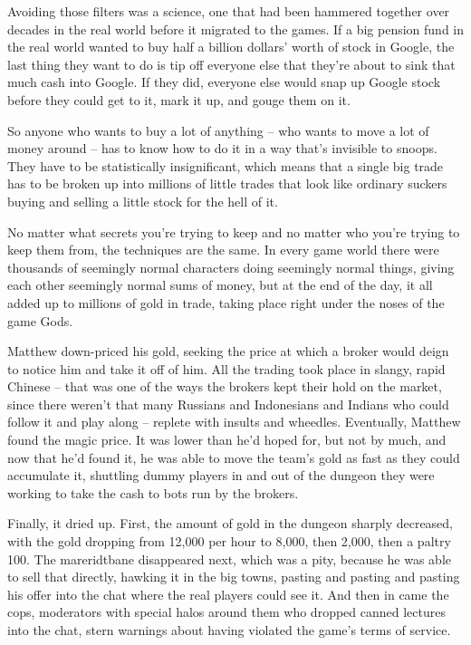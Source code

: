 Avoiding those filters was a science, one that had been hammered
together over decades in the real world before it migrated to the
games. If a big pension fund in the real world wanted to buy half a
billion dollars' worth of stock in Google, the last thing they want
to do is tip off everyone else that they're about to sink that much
cash into Google. If they did, everyone else would snap up Google
stock before they could get to it, mark it up, and gouge them on
it.

So anyone who wants to buy a lot of anything -- who wants to move a
lot of money around -- has to know how to do it in a way that's
invisible to snoops. They have to be statistically insignificant,
which means that a single big trade has to be broken up into
millions of little trades that look like ordinary suckers buying
and selling a little stock for the hell of it.

No matter what secrets you're trying to keep and no matter who
you're trying to keep them from, the techniques are the same. In
every game world there were thousands of seemingly normal
characters doing seemingly normal things, giving each other
seemingly normal sums of money, but at the end of the day, it all
added up to millions of gold in trade, taking place right under the
noses of the game Gods.

Matthew down-priced his gold, seeking the price at which a broker
would deign to notice him and take it off of him. All the trading
took place in slangy, rapid Chinese -- that was one of the ways the
brokers kept their hold on the market, since there weren't that
many Russians and Indonesians and Indians who could follow it and
play along -- replete with insults and wheedles. Eventually,
Matthew found the magic price. It was lower than he'd hoped for,
but not by much, and now that he'd found it, he was able to move
the team's gold as fast as they could accumulate it, shuttling
dummy players in and out of the dungeon they were working to take
the cash to bots run by the brokers.

Finally, it dried up. First, the amount of gold in the dungeon
sharply decreased, with the gold dropping from 12,000 per hour to
8,000, then 2,000, then a paltry 100. The mareridtbane disappeared
next, which was a pity, because he was able to sell that directly,
hawking it in the big towns, pasting and pasting and pasting his
offer into the chat where the real players could see it. And then
in came the cops, moderators with special halos around them who
dropped canned lectures into the chat, stern warnings about having
violated the game's terms of service.

